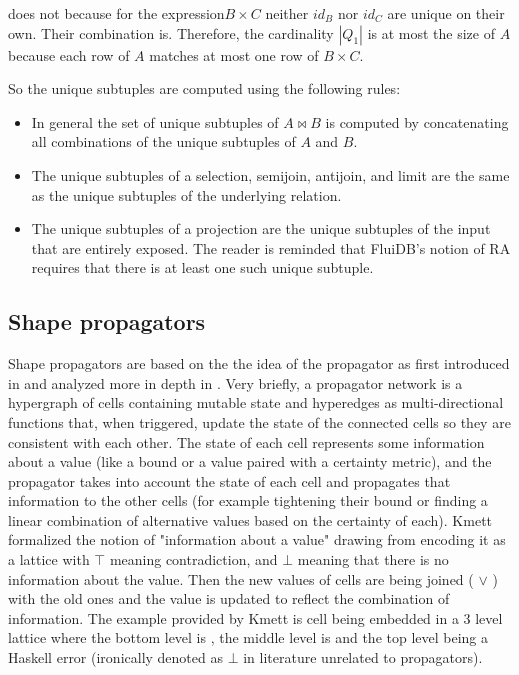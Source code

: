 does not because for the expression\(B \times C\) neither \(id_B\) nor
\(id_C\) are unique on their own.  Their combination is. Therefore,
the cardinality \(|Q_1|\) is at most the size of \(A\) because each
row of \(A\) matches at most one row of \(B \times C\).

So the unique subtuples are computed using the following rules:

\begin{itemize}
\item In general the set of unique subtuples of \(A \Join B\) is
  computed by concatenating all combinations of the unique subtuples
  of \(A\) and \(B\).
\item The unique subtuples of a selection, semijoin, antijoin, and limit are the same as the unique
  subtuples of the underlying relation.
\item The unique subtuples of a projection are the unique subtuples of
  the input that are entirely exposed.  The reader is reminded that
  FluiDB's notion of RA requires that there is at least one such
  unique subtuple.
\end{itemize}

\subsection{Shape propagators}
\label{sec:shape_propagators}

Shape propagators are based on the the idea of the propagator as first
introduced in \cite{sussmanArtPropagator2009} and analyzed more in
depth in \cite{hansonSoftwareDesignFlexibility2021a}. Very briefly, a
propagator network is a hypergraph of cells containing mutable state
and hyperedges as multi-directional functions that, when triggered,
update the state of the connected cells so they are consistent with
each other. The state of each cell represents some information about a
value (like a bound or a value paired with a certainty metric), and
the propagator takes into account the state of each cell and
propagates that information to the other cells (for example tightening
their bound or finding a linear combination of alternative values
based on the certainty of each). Kmett \cite{kmettPropagators2021}
formalized the notion of "information about a value" drawing from
\cite{kuperLVarsLatticebasedData2013} encoding it as a lattice with
\(\top\) meaning contradiction, and \(\bot\) meaning that there is no
information about the value. Then the new values of cells are being
joined ( \(\lor\) ) with the old ones and the value is updated to
reflect the combination of information. The example provided by Kmett
is cell being embedded in a 3 level lattice where the bottom level is
, the middle level is  and the top level
being a Haskell error (ironically denoted as \(\bot\) in literature
unrelated to propagators).

